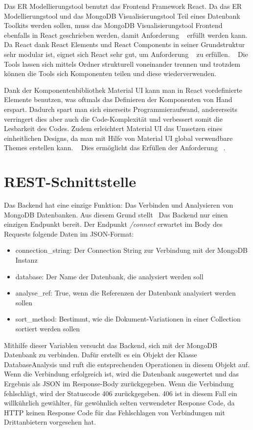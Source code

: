 Das ER Modellierungstool benutzt das Frontend Framework React.
Da das ER Modellierungstool und das MongoDB Visualisierungstool Teil eines Datenbank Toolkits werden sollen, muss das MongoDB Visualisierungstool Frontend ebenfalls in React geschrieben werden, damit Anforderung ~ erfüllt werden kann.
Da React dank React Elements und React Components in seiner Grundstruktur  sehr modular ist, eignet sich React sehr gut, um Anforderung ~ zu erfüllen.
~\autocite{banks:react}
Die Tools lassen sich mittels Ordner strukturell voneinander trennen und trotzdem können die Tools sich Komponenten teilen und diese wiederverwenden.

Dank der Komponentenbibliothek Material UI kann man in React vordefinierte Elemente benutzen, was oftmals das Definieren der Komponenten von Hand erspart.
Dadurch spart man sich einerseits Programmieraufwand, andererseits verringert dies aber auch die Code-Komplexität und verbessert somit die Lesbarkeit des Codes.
Zudem erleichtert Material UI das Umsetzen eines einheitlichen Designs, da man mit Hilfe von Material UI global verwendbare Themes erstellen kann.
~\autocite{mui:mui}
Dies ermöglicht das Erfüllen der Anforderung ~.

\section{REST-Schnittstelle}
\label{sec:rest_schnittstelle}
Das Backend hat eine einzige Funktion:
Das Verbinden und Analysieren von MongoDB Datenbanken.
Aus diesem Grund stellt ~Das Backend nur einen einzigen Endpunkt bereit.
Der Endpunkt \textit{/connect} erwartet im Body des Requests folgende Daten im JSON-Format:
\begin{itemize}
    \item connection\_string: Der Connection String zur Verbindung mit der MongoDB Instanz
    \item database: Der Name der Datenbank, die analysiert werden soll
    \item analyse\_ref: True, wenn die Referenzen der Datenbank analysiert werden sollen
    \item sort\_method: Bestimmt, wie die Dokument-Variationen in einer Collection sortiert werden sollen
\end{itemize}
Mithilfe dieser Variablen versucht das Backend, sich mit der MongoDB Datenbank zu verbinden.
Dafür erstellt es ein Objekt der Klasse DatabaseAnalysis und ruft die entsprechenden Operationen in diesem Objekt auf.
Wenn die Verbindung erfolgreich ist, wird die Datenbank ausgewertet und das Ergebnis als JSON im Response-Body zurückgegeben.
Wenn die Verbindung fehlschlägt, wird der Statuscode 406 zurückgegeben.
406 ist in diesem Fall ein willkührlich gewählter, für gewöhnlich selten verwendeter Response Code, da HTTP keinen Response Code für das Fehlschlagen von Verbindungen mit Drittanbietern vorgesehen hat.

